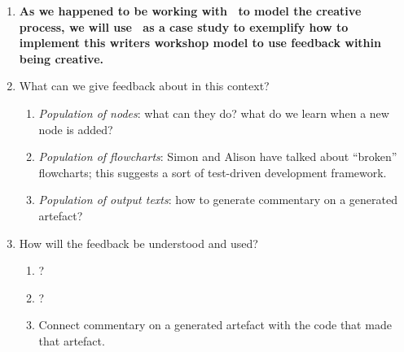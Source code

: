 \begin{enumerate}[start=3]
\item \textbf{As we happened to be working with \Fw\ to model the
  creative process, we will use \Fw\ as a case study to exemplify how
  to implement this writers workshop model to use feedback within
  being creative.}
\item[] What can we give feedback about in this context?
\begin{enumerate}
\item \emph{Population of nodes}: what can they do?  what do we learn when a
  new node is added?
\item \emph{Population of flowcharts}: Simon and Alison have talked
  about ``broken'' flowcharts; this suggests a sort of test-driven
  development framework.
\item \emph{Population of output texts}: how to generate commentary on
  a generated artefact?
\end{enumerate}
\item[] How will the feedback be understood and used?
\begin{enumerate}
\item ?
\item ?
\item Connect commentary on a generated artefact with the code that
  made that artefact.
\end{enumerate}
\end{enumerate}
